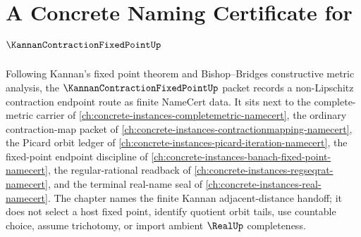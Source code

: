 \chapter{A Concrete Naming Certificate for $\KannanContractionFixedPointUp$}
\label{ch:concrete-instances-kannan-contraction-fixed-point-namecert}

Following Kannan's fixed point theorem and Bishop--Bridges constructive metric analysis, the $\KannanContractionFixedPointUp$ packet records a non-Lipschitz contraction endpoint route as finite NameCert data. It sits next to the complete-metric carrier of \autoref{ch:concrete-instances-completemetric-namecert}, the ordinary contraction-map packet of \autoref{ch:concrete-instances-contractionmapping-namecert}, the Picard orbit ledger of \autoref{ch:concrete-instances-picard-iteration-namecert}, the fixed-point endpoint discipline of \autoref{ch:concrete-instances-banach-fixed-point-namecert}, the regular-rational readback of \autoref{ch:concrete-instances-regseqrat-namecert}, and the terminal real-name seal of \autoref{ch:concrete-instances-real-namecert}. The chapter names the finite Kannan adjacent-distance handoff; it does not select a host fixed point, identify quotient orbit tails, use countable choice, assume trichotomy, or import ambient $\RealUp$ completeness.

